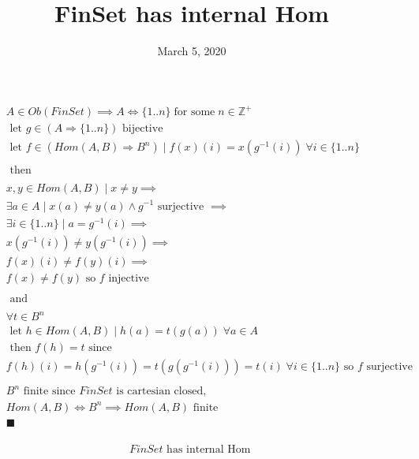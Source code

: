 \documentclass[fleqn, 11pt]{article}
\date{March 5, 2020}
\title{FinSet has internal Hom}
\begin{document}
\begin{equation*}
\begin{aligned}
& A \in Ob(FinSet) \implies A \Leftrightarrow \{1..n\}
    \;\text{for some}\; n \in \mathbb{Z}^{+} \\
& \text{ let } g \in (A \Rightarrow \{1..n\})
  \text{ bijective } \\
& \text{ let } f \in (Hom(A, B) \Rightarrow B^n)
  \mid f(x)(i) = x(g^{-1}(i)) \;
  \forall i \in \{1..n\} \\
& \\
& \text{ then } \\
& \\
& x, y \in Hom(A, B) \mid x \neq y \implies \\
& \exists a \in A \mid x(a) \neq y(a) \land
  g^{-1} \text{ surjective } \implies \\
& \exists i \in \{1..n\} \mid a = g^{-1}(i)
  \implies \\
& x(g^{-1}(i)) \neq y(g^{-1}(i)) \implies \\
& f(x)(i) \neq f(y)(i) \implies \\
& f(x) \neq f(y) \text{ so } f \text{ injective } \\
& \\
& \text{ and } \\
& \\
& \forall t \in B^n \\
& \text{ let } h \in Hom(A, B) \mid h(a) = t(g(a)) \;
  \forall a \in A \\
& \text{ then } f(h) = t \text{ since } \\
& f(h)(i) = h(g^{-1}(i)) = t(g(g^{-1}(i))) = t(i) \;
  \forall i \in \{1..n\} \text{ so }
  f \text{ surjective } \\
& \\
& B^n \text{ finite since } FinSet
  \text{ is cartesian closed, } \\
& Hom(A, B) \Leftrightarrow B^n \implies
  Hom(A, B) \text{ finite } \\
& \blacksquare \\
\end{aligned}
\end{equation*}

\hrulefill

$$ FinSet \text{ has internal Hom } $$
\end{document}
